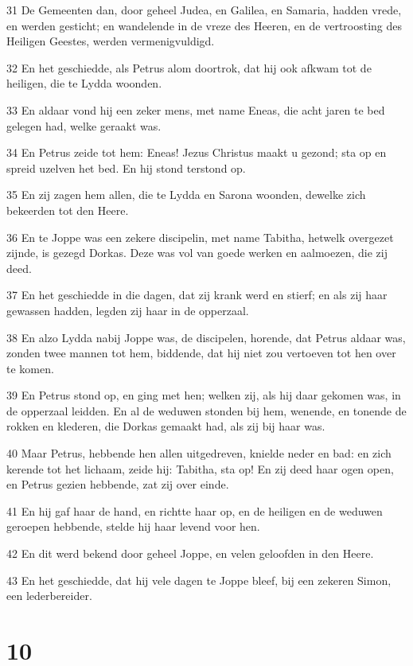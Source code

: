 \par 31 De Gemeenten dan, door geheel Judea, en Galilea, en Samaria, hadden vrede, en werden gesticht; en wandelende in de vreze des Heeren, en de vertroosting des Heiligen Geestes, werden vermenigvuldigd.
\par 32 En het geschiedde, als Petrus alom doortrok, dat hij ook afkwam tot de heiligen, die te Lydda woonden.
\par 33 En aldaar vond hij een zeker mens, met name Eneas, die acht jaren te bed gelegen had, welke geraakt was.
\par 34 En Petrus zeide tot hem: Eneas! Jezus Christus maakt u gezond; sta op en spreid uzelven het bed. En hij stond terstond op.
\par 35 En zij zagen hem allen, die te Lydda en Sarona woonden, dewelke zich bekeerden tot den Heere.
\par 36 En te Joppe was een zekere discipelin, met name Tabitha, hetwelk overgezet zijnde, is gezegd Dorkas. Deze was vol van goede werken en aalmoezen, die zij deed.
\par 37 En het geschiedde in die dagen, dat zij krank werd en stierf; en als zij haar gewassen hadden, legden zij haar in de opperzaal.
\par 38 En alzo Lydda nabij Joppe was, de discipelen, horende, dat Petrus aldaar was, zonden twee mannen tot hem, biddende, dat hij niet zou vertoeven tot hen over te komen.
\par 39 En Petrus stond op, en ging met hen; welken zij, als hij daar gekomen was, in de opperzaal leidden. En al de weduwen stonden bij hem, wenende, en tonende de rokken en klederen, die Dorkas gemaakt had, als zij bij haar was.
\par 40 Maar Petrus, hebbende hen allen uitgedreven, knielde neder en bad: en zich kerende tot het lichaam, zeide hij: Tabitha, sta op! En zij deed haar ogen open, en Petrus gezien hebbende, zat zij over einde.
\par 41 En hij gaf haar de hand, en richtte haar op, en de heiligen en de weduwen geroepen hebbende, stelde hij haar levend voor hen.
\par 42 En dit werd bekend door geheel Joppe, en velen geloofden in den Heere.
\par 43 En het geschiedde, dat hij vele dagen te Joppe bleef, bij een zekeren Simon, een lederbereider.

\chapter{10}


